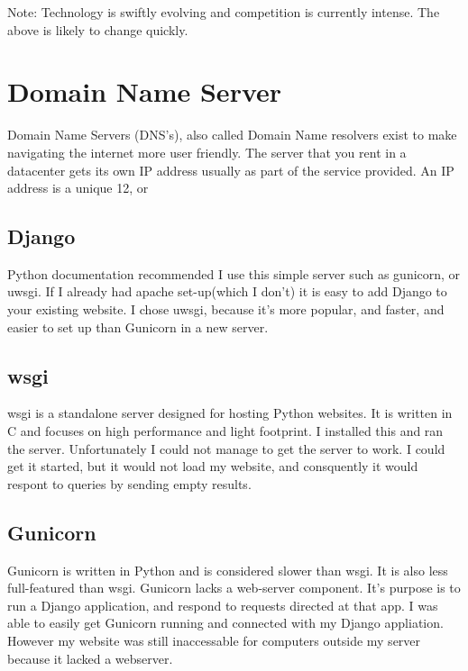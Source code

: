 {\begin{itemize}
    Note: Technology is swiftly evolving and competition is currently intense. The above is likely to change quickly.
    
\end{itemize}

\section{Domain Name Server}

Domain Name Servers (DNS's), also called Domain Name resolvers exist to make navigating the internet more user friendly.  The server that you rent in a datacenter gets its own IP address usually as part of the service provided.  An IP address is a unique 12, or 


\subsection{Django}

Python documentation recommended I use this simple server such as gunicorn, or uwsgi.  If I already had apache set-up(which I don't) it is easy to add Django to your existing website.  I chose uwsgi, because it's more popular, and faster, and easier to set up than Gunicorn in a new server.


\subsection{wsgi}

wsgi is a standalone server designed for hosting Python websites.   It is written in C and focuses on high performance and light footprint.  I installed this and ran the server.  Unfortunately I could not manage to get the server to work.  I could get it started, but it would not load my website, and consquently it would respont to queries by sending empty results.

\subsection{Gunicorn}

Gunicorn is written in Python and is considered slower than wsgi.  It is also less full-featured than wsgi.  Gunicorn lacks a web-server component.  It's purpose is to run a Django application, and respond to requests directed at that app.  I was able to easily get Gunicorn running and connected with my Django appliation.  However my website was still inaccessable for computers outside my server because it lacked a webserver.

}
